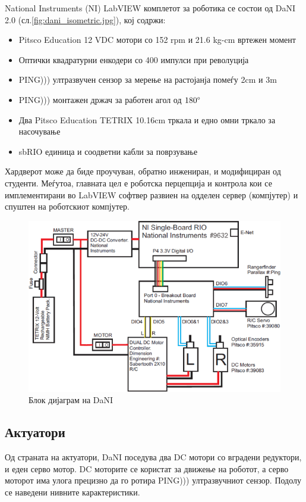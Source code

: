 \documentclass[12pt]{article}
\begin{document}
	National Instruments (NI) LabVIEW комплетот за роботика се состои од DaNI 2.0 (сл.\ref{fig:dani_isometric.jpg}), кој содржи:

	\begin{itemize}
		\item Pitsco Education 12 VDC мотори со 152 rpm и 21.6 kg-cm вртежен момент
		\item Оптички квадратурни енкодери со 400 импулси при револуција
		\item PING))) ултразвучен сензор за мерење на растојанја помеѓу 2cm и 3m
		\item PING))) монтажен држач за работен агол од $180 \degree$
		\item Два Pitsco Education TETRIX 10.16cm тркала и едно омни тркало за насочување
		\item sbRIO единица и соодветни кабли за поврзување
		\end{itemize}

	Хардверот може да биде проучуван, обратно инжениран, и модифициран од студенти. Меѓутоа, главната цел е роботска перцепција и контрола кои се имплементирани во LabVIEW софтвер развиен на одделен сервер (компјутер) и спуштен на роботскиот компјутер.

	\begin{figure}[H]
		\includegraphics[width=0.75\linewidth]{./images/dani_block_diagram.png}
		\centering
		\caption{Блок дијаграм на DaNI}
		\label{fig:dani_block_diagram.png}
		\end{figure}

	\subsection{Актуатори}
		Од страната на актуатори, DaNI поседува два DC мотори со вградени редуктори, и еден серво мотор. DC моторите се користат за движење на роботот, а серво моторот има улога прецизно да го ротира PING))) ултразвучниот сензор. Подолу се наведени нивните карактеристики.
\end{document}
